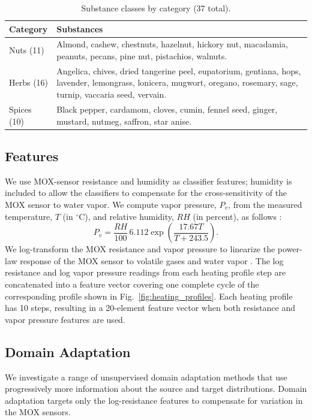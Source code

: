 \documentclass[conference]{IEEEtran}
\begin{document}
\begin{table}[htbp]
\caption{Substance classes by category (37 total).}
\label{tab:substance-classes}
\centering
\footnotesize
\begin{tabular}{|p{}|p{}|}
\hline
\textbf{Category} & \textbf{Substances} \\
\hline
Nuts (11) &
Almond, cashew, chestnuts, hazelnut, hickory nut,
macadamia, peanuts, pecans, pine nut, pistachios,
walnuts. \\
\hline
Herbs (16) &
Angelica, chives, dried tangerine peel, eupatorium,
gentiana, hops, lavender, lemongrass, lonicera,
mugwort, oregano, rosemary, sage, turnip,
vaccaria seed, vervain. \\
\hline
Spices (10) &
Black pepper, cardamom, cloves, cumin, fennel seed,
ginger, mustard, nutmeg, saffron, star anise. \\
\hline
\end{tabular}
\end{table}

\subsection{Features}
We use MOX-sensor resistance and humidity as classifier features; humidity is included to allow the classifiers to compensate for the cross-sensitivity of the MOX sensor to water vapor.
We compute vapor pressure, $P_v$, from the measured temperature, $T$ (in $^\circ$C), and relative humidity, $RH$ (in percent), as follows \cite{bolton1980computation}:
\begin{equation}
P_v = \frac{RH}{100}\,6.112\exp\left(\frac{17.67T}{T+243.5}\right).
\end{equation}
We log-transform the MOX resistance and vapor pressure to linearize the power-law response of the MOX sensor to volatile gases and water vapor \cite{yamazoe2008theory}. 
The log resistance and log vapor pressure readings from each heating profile step are concatenated into a feature vector covering one complete cycle of the corresponding profile shown in Fig.~\ref{fig:heating_profiles}. Each heating profile has 10 steps, resulting in a 20-element feature vector when both resistance and vapor pressure features are used.

\subsection{Domain Adaptation}
We investigate a range of unsupervised domain adaptation methods that use progressively more information about the source and target distributions.
Domain adaptation targets only the log-resistance features to compensate for variation in the MOX sensors.
\end{document}
